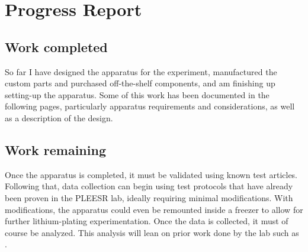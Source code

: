 \chapter{Progress Report}

\section{Work completed}
So far I have designed the apparatus for the experiment, manufactured the custom parts and purchased off-the-shelf components, and am finishing up setting-up the apparatus. Some of this work has been documented in the following pages, particularly apparatus requirements and considerations, as well as a description of the design. 

\section{Work remaining}
Once the apparatus is completed, it must be validated using known test articles. Following that, data collection can begin using test protocols that have already been proven in the PLEESR lab, ideally requiring minimal modifications. With modifications, the apparatus could even be remounted inside a freezer to allow for further lithium-plating experimentation. Once the data is collected, it must of course be analyzed. This analysis will lean on prior work done by the lab such as \cite{ANODE-CHAR} \cite{SOC-SOH-EST} \cite{TOF-STATE}.